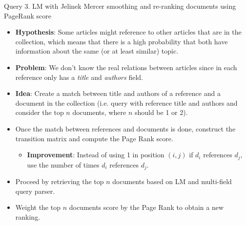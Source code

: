 \documentclass[10pt]{beamer}
\begin{document}
{\begin{frame}{Query 3. LM with Jelinek Mercer smoothing and re-ranking documents using PageRank score}
    \begin{itemize}
        \item \textbf{Hypothesis}: Some articles might reference to other articles that are in the collection, which means that there is a high probability that both have information about the same (or at least similar) topic. 
        \item \textbf{Problem}: We don't know the real relations between articles since in each reference only has a \textit{title} and \textit{authors} field.
        \item \textbf{Idea}: Create a match between title and authors of a reference and a document in the collection (i.e. query with reference title and authors and consider the top $n$ documents, where $n$ should be 1 or 2).
        \item Once the match between references and documents is done, construct the transition matrix and compute the Page Rank score.
        \begin{itemize}
            \item \textbf{Improvement}: Instead of using 1 in position $(i, j)$ if $d_i$ references $d_j$, use the number of times $d_i$ references $d_j$.
        \end{itemize}
        \item Proceed by retrieving the top $n$ documents based on LM and multi-field query parser.
        \item Weight the top $n$ documents score by the Page Rank to obtain a new ranking.
    \end{itemize}
\end{frame}


}
\end{document}
